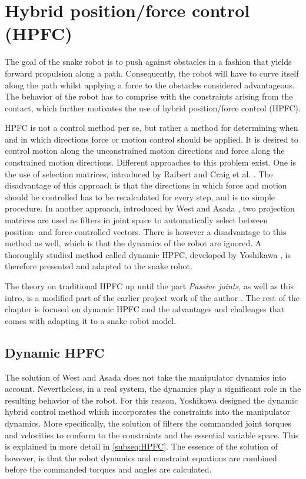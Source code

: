 \section{Hybrid position/force control (HPFC)}

The goal of the snake robot is to push against obstacles in a fashion that yields forward propulsion along a path. Consequently, the robot will have to curve itself along the path whilst applying a force to the obstacles considered advantageous. The behavior of the robot has to comprise with the constraints arising from the contact, which further motivates the use of hybrid position/force control (HPFC).

HPFC is not a control method per se, but rather a method for determining when and in which directions force or motion control should be applied. It is desired to control motion along the unconstrained motion directions and force along the constrained motion directions. Different approaches to this problem exist. One is the use of selection matrices, introduced by Raibert and Craig et al. \cite{raibert1981hybrid}. The disadvantage of this approach is that the directions in which force and motion should be controlled has to be recalculated for every step, and is no simple procedure. In another approach, introduced by West and Asada \cite{west1985method}, two projection matrices are used as filters in joint space to automatically select between position- and force controlled vectors. There is however a disadvantage to this method as well, which is that the dynamics of the robot are ignored. A thoroughly studied method called dynamic HPFC, developed by Yoshikawa \cite{yoshikawa1987dynamic}, is therefore presented and adapted to the snake robot.

The theory on traditional HPFC up until the part \textit{Passive joints}, as well as this intro, is a modified part of the earlier project work of the author \cite{AtussaProsjektoppgp}. The rest of the chapter is focused on dynamic HPFC and the advantages and challenges that comes with adapting it to a snake robot model.



\subsection{Dynamic HPFC} \label{subsec:DHPFC}

The solution of West and Asada \cite{west1985method} does not take the manipulator dynamics into account. Nevertheless, in a real system, the dynamics play a significant role in the resulting behavior of the robot. For this reason, Yoshikawa \cite{yoshikawa1987dynamic} designed the dynamic hybrid control method which incorporates the constraints into the manipulator dynamics. More specifically, the solution of \cite{west1985method} filters the commanded joint torques and velocities to conform to the constraints and the essential variable space. This is explained in more detail in \ref{subseq:HPFC}. The essence of the solution of \cite{yoshikawa1987dynamic} however, is that the robot dynamics and constraint equations are combined before the commanded torques and angles are calculated. 

